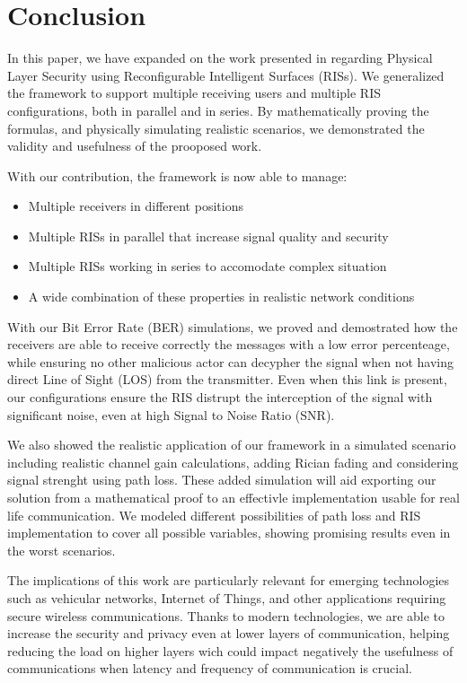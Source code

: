 \section*{Conclusion}

In this paper, we have expanded on the work presented in \cite{9328149} regarding Physical Layer Security using Reconfigurable Intelligent Surfaces (RISs). We generalized the framework to support multiple receiving users and multiple RIS configurations, both in parallel and in series. By mathematically proving the formulas, and physically simulating realistic scenarios, we demonstrated the validity and usefulness of the prooposed work.

With our contribution, the framework is now able to manage:
\begin{itemize}
  \item Multiple receivers in different positions
  \item Multiple RISs in parallel that increase signal quality and security
  \item Multiple RISs working in series to accomodate complex situation
  \item A wide combination of these properties in realistic network conditions
\end{itemize}

With our Bit Error Rate (BER) simulations, we proved and demostrated how the receivers are able to receive correctly the messages with a low error percenteage, while ensuring no other malicious actor can decypher the signal when not having direct Line of Sight (LOS) from the transmitter. Even when this link is present, our configurations ensure the RIS distrupt the interception of the signal with significant noise, even at high Signal to Noise Ratio (SNR).

We also showed the realistic application of our framework in a simulated scenario including realistic channel gain calculations, adding Rician fading and considering signal strenght using path loss. These added simulation will aid exporting our solution from a mathematical proof to an effectivle implementation usable for real life communication. We modeled different possibilities of path loss and RIS implementation to cover all possible variables, showing promising results even in the worst scenarios.

The implications of this work are particularly relevant for emerging technologies such as vehicular networks, Internet of Things, and other applications requiring secure wireless communications. Thanks to modern technologies, we are able to increase the security and privacy even at lower layers of communication, helping reducing the load on higher layers wich could impact negatively the usefulness of communications when latency and frequency of communication is crucial.


